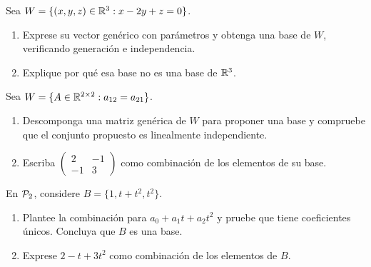 \documentclass[compacto,10pt]{pubciencias-notas}
\begin{document}
\begin{ejer}
    Sea $W=\{(x,y,z)\in\R^3:x-2y+z=0\}$.
    \begin{enumerate}
        \item Exprese su vector genérico con parámetros y obtenga una
              base de $W$, verificando generación e independencia.
        \item Explique por qué esa base no es una base de $\R^3$.
    \end{enumerate}
\end{ejer}

\begin{ejer}
    Sea $W=\{A\in\Mat[\R]{2}{2}:a_{12}=a_{21}\}$.
    \begin{enumerate}
        \item Descomponga una matriz genérica de $W$ para proponer una
              base y compruebe que el conjunto propuesto es linealmente
              independiente.
        \item Escriba $\begin{pmatrix}2&-1\\-1&3\end{pmatrix}$ como
              combinación de los elementos de su base.
    \end{enumerate}
\end{ejer}

\begin{ejer}
    En $\Pol_2$, considere $B=\{1,t+t^2,t^2\}$.
    \begin{enumerate}
        \item Plantee la combinación para $a_0+a_1t+a_2t^2$ y pruebe
              que tiene coeficientes únicos. Concluya que $B$ es una base.
        \item Exprese $2-t+3t^2$ como combinación de los elementos de $B$.
    \end{enumerate}
\end{ejer}
\end{document}
